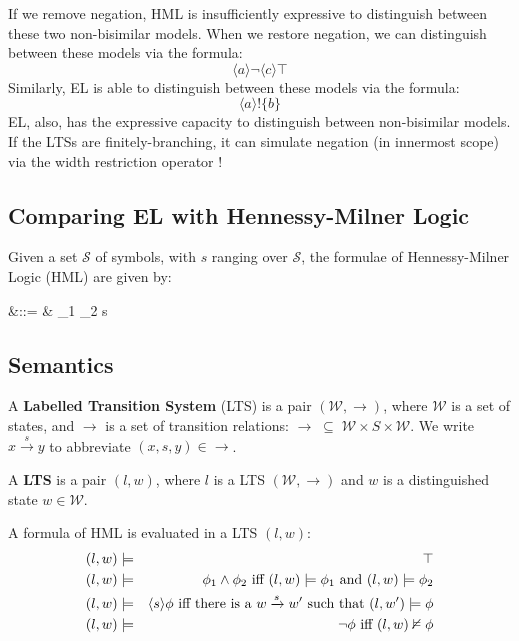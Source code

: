 If we remove negation, HML  is insufficiently expressive to distinguish between these two non-bisimilar models.
When we restore negation, we can distinguish between these models via the formula:
\[
\langle a \rangle \neg \langle c \rangle \top
\]
Similarly, EL is able to distinguish between these models via the formula:
\[
\langle a \rangle ! \{b\}
\]
EL, also, has the expressive capacity to distinguish between non-bisimilar models. If the LTSs are finitely-branching, it can simulate negation (in innermost scope) via the width restriction operator !

\subsection{Comparing EL with Hennessy-Milner Logic}

Given a set $\mathcal{S}$ of symbols, with $s$ ranging over $\mathcal{S}$, the formulae of Hennessy-Milner Logic (HML) are given by:
\begin{GRAMMAR}
  \phi 
     &\quad ::= \quad & 
  \top \fOr \phi_1 \AND \phi_2 \fOr \langle s \rangle \phi \fOr \neg \phi 
\end{GRAMMAR}
\subsection{Semantics}
A {\bf Labelled Transition System} (LTS) is a pair $(\mathcal{W}, \rightarrow)$, where $\mathcal{W}$ is a set of states, and $\rightarrow$ is a set of transition relations: $\rightarrow \; \subseteq \; \mathcal{W} \times S \times \mathcal{W}$.
We write $x \xrightarrow{s} y$ to abbreviate $(x,s,y) \in \rightarrow$.

A {\bf  LTS} is a pair $(l, w)$, where $l$ is a LTS $(\mathcal{W}, \rightarrow)$ and $w$ is a distinguished state $w \in \mathcal{W}$.

A formula of HML is evaluated in a  LTS $(l, w)$:
\begin{eqnarray*}
(l,w) & \models & \top  \\
(l,w) & \models & \phi_1 \land \phi_2 \mbox{ iff } (l,w)  \models \phi_1 \mbox { and } (l,w) \models \phi_2  \\
(l,w) & \models & \langle s \rangle \phi \mbox{ iff there is a } w \xrightarrow{s} w' \mbox { such that } (l,w') \models \phi  \\
(l,w) & \models & \neg \phi \mbox{ iff } (l,w)  \nvDash \phi 
\end{eqnarray*}


